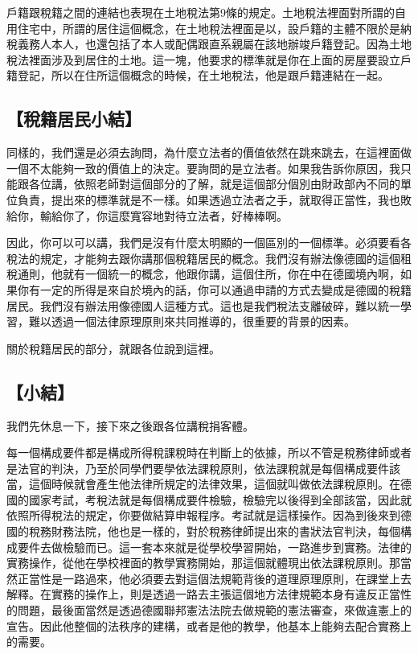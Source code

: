 \documentclass[oneside,sub3section]{ctexbook}
\begin{document}
戶籍跟稅籍之間的連結也表現在土地稅法第9條的規定。土地稅法裡面對所謂的自用住宅中，所謂的居住這個概念，在土地稅法裡面是以，設戶籍的主體不限於是納稅義務人本人，也還包括了本人或配偶跟直系親屬在該地辦竣戶籍登記。因為土地稅法裡面涉及到居住的土地。這一塊，他要求的標準就是你在上面的房屋要設立戶籍登記，所以在住所這個概念的時候，在土地稅法，他是跟戶籍連結在一起。

\hypertarget{ux7a05ux7c4dux5c45ux6c11ux5c0fux7d50}{%
\subsection{【稅籍居民小結】}\label{ux7a05ux7c4dux5c45ux6c11ux5c0fux7d50}}

同樣的，我們還是必須去詢問，為什麼立法者的價值依然在跳來跳去，在這裡面做一個不太能夠一致的價值上的決定。要詢問的是立法者。如果我告訴你原因，我只能跟各位講，依照老師對這個部分的了解，就是這個部分個別由財政部內不同的單位負責，提出來的標準就是不一樣。如果透過立法者之手，就取得正當性，我也敗給你，輸給你了，你這麼寬容地對待立法者，好棒棒啊。

因此，你可以可以講，我們是沒有什麼太明顯的一個區別的一個標準。必須要看各稅法的規定，才能夠去跟你講那個稅籍居民的概念。我們沒有辦法像德國的這個租稅通則，他就有一個統一的概念，他跟你講，這個住所，你在中在德國境內啊，如果你有一定的所得是來自於境內的話，你可以通過申請的方式去變成是德國的稅籍居民。我們沒有辦法用像德國人這種方式。這也是我們稅法支離破碎，難以統一學習，難以透過一個法律原理原則來共同推導的，很重要的背景的因素。

關於稅籍居民的部分，就跟各位說到這裡。

\hypertarget{ux5c0fux7d50}{%
\subsection{【小結】}\label{ux5c0fux7d50}}

我們先休息一下，接下來之後跟各位講稅捐客體。

每一個構成要件都是構成所得稅課稅時在判斷上的依據，所以不管是稅務律師或者是法官的判決，乃至於同學們要學依法課稅原則，依法課稅就是每個構成要件該當，這個時候就會產生他法律所規定的法律效果，這個就叫做依法課稅原則。在德國的國家考試，考稅法就是每個構成要件檢驗，檢驗完以後得到全部該當，因此就依照所得稅法的規定，你要做結算申報程序。考試就是這樣操作。因為到後來到德國的稅務財務法院，他也是一樣的，對於稅務律師提出來的書狀法官判決，每個構成要件去做檢驗而已。這一套本來就是從學校學習開始，一路進步到實務。法律的實務操作，從他在學校裡面的教學實務開始，那這個就體現出依法課稅原則。那當然正當性是一路過來，他必須要去對這個法規範背後的道理原理原則，在課堂上去解釋。在實務的操作上，則是透過一路去主張這個地方法律規範本身有違反正當性的問題，最後面當然是透過德國聯邦憲法法院去做規範的憲法審查，來做違憲上的宣告。因此他整個的法秩序的建構，或者是他的教學，他基本上能夠去配合實務上的需要。
\end{document}
